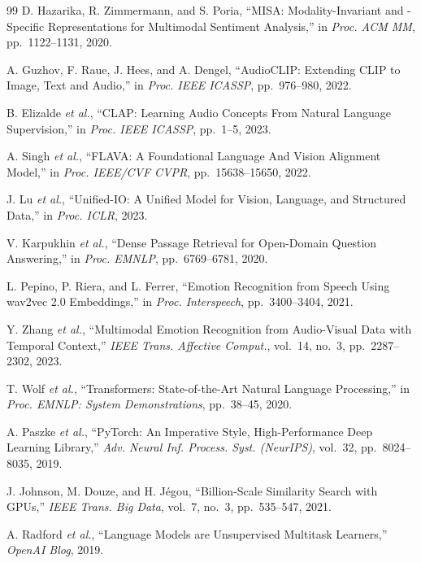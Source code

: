 \documentclass[10pt,conference]{IEEEtran}
\theoremstyle{ieeethm}
\theoremstyle{ieeedef}
\theoremstyle{ieeeremark}
\begin{document}
\begin{thebibliography}{99}
D. Hazarika, R. Zimmermann, and S. Poria,
``MISA: Modality-Invariant and -Specific Representations for Multimodal Sentiment Analysis,''
in \textit{Proc. ACM MM}, pp.~1122--1131, 2020.

A. Guzhov, F. Raue, J. Hees, and A. Dengel,
``AudioCLIP: Extending CLIP to Image, Text and Audio,''
in \textit{Proc. IEEE ICASSP}, pp.~976--980, 2022.

B. Elizalde \textit{et al.},
``CLAP: Learning Audio Concepts From Natural Language Supervision,''
in \textit{Proc. IEEE ICASSP}, pp.~1--5, 2023.

A. Singh \textit{et al.},
``FLAVA: A Foundational Language And Vision Alignment Model,''
in \textit{Proc. IEEE/CVF CVPR}, pp.~15638--15650, 2022.

J. Lu \textit{et al.},
``Unified-IO: A Unified Model for Vision, Language, and Structured Data,''
in \textit{Proc. ICLR}, 2023.

V. Karpukhin \textit{et al.},
``Dense Passage Retrieval for Open-Domain Question Answering,''
in \textit{Proc. EMNLP}, pp.~6769--6781, 2020.

L. Pepino, P. Riera, and L. Ferrer,
``Emotion Recognition from Speech Using wav2vec 2.0 Embeddings,''
in \textit{Proc. Interspeech}, pp.~3400--3404, 2021.

Y. Zhang \textit{et al.},
``Multimodal Emotion Recognition from Audio-Visual Data with Temporal Context,''
\textit{IEEE Trans. Affective Comput.}, vol.~14, no.~3, pp.~2287--2302, 2023.

T. Wolf \textit{et al.},
``Transformers: State-of-the-Art Natural Language Processing,''
in \textit{Proc. EMNLP: System Demonstrations}, pp.~38--45, 2020.

A. Paszke \textit{et al.},
``PyTorch: An Imperative Style, High-Performance Deep Learning Library,''
\textit{Adv. Neural Inf. Process. Syst. (NeurIPS)}, vol.~32, pp.~8024--8035, 2019.

J. Johnson, M. Douze, and H. J{\'e}gou,
``Billion-Scale Similarity Search with GPUs,''
\textit{IEEE Trans. Big Data}, vol.~7, no.~3, pp.~535--547, 2021.

A. Radford \textit{et al.},
``Language Models are Unsupervised Multitask Learners,''
\textit{OpenAI Blog}, 2019.

\end{thebibliography}
\end{document}
